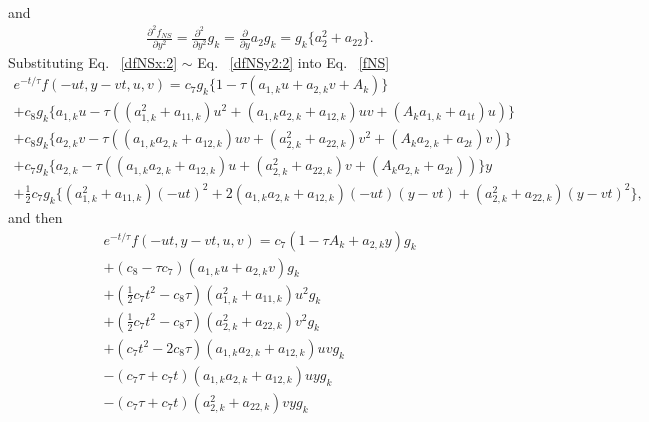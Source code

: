 \documentclass[review]{elsarticle}
\begin{document}
\begin{itemize}
\begin{eqnarray}
		\end{eqnarray}	
		and
		\begin{eqnarray}\label{dfNSy2:2}
			\frac{\partial^2 f_{NS}}{\partial y^2}=\frac{\partial^{2}}{\partial y^{2}} {g_{k}}
			=\frac{\partial}{\partial y} {a_2g_{k}}=g_k\{a_2^2+a_{22}\}.
		\end{eqnarray}
		Substituting Eq. ~\eqref{dfNSx:2} $\sim$ Eq. ~\eqref{dfNSy2:2} into Eq. ~\eqref{fNS}
		\begin{equation}\label{fNS:2}
		\begin{gathered}
			e^{-t/\tau}f(-ut, y-vt, u, v) = c_7g_k\{1-\tau\left(a_{1,k}u+a_{2,k}v+A_k\right)\}\\
			+c_8g_k\{
				a_{1,k}u-\tau\left(
				\left(a_{1,k}^2+a_{11,k}\right)u^2
				+\left(a_{1,k}a_{2,k}+a_{12,k}\right)uv
				+\left(A_ka_{1,k}+a_{1t}\right)u
				\right)
			    \}\\
			+c_8g_k\{
				a_{2,k}v-\tau\left(
				\left(a_{1,k}a_{2,k}+a_{12,k}\right)uv
				+\left(a_{2,k}^2+a_{22,k}\right)v^2
				+\left(A_ka_{2,k}+a_{2t}\right)v
				\right)
				\}\\
			+c_7g_k\{
				a_{2,k}-\tau\left(
				\left(a_{1,k}a_{2,k}+a_{12,k}\right)u
				+\left(a_{2,k}^2+a_{22,k}\right)v
				+\left(A_ka_{2,k}+a_{2t}\right)
				\right)
				\}y\\
			+\frac{1}{2}c_7g_k\{
				\left(a_{1,k}^2+a_{11,k}\right)\left(-ut\right)^2
				+2\left(a_{1,k}a_{2,k}+a_{12,k}\right)\left(-ut\right)\left(y-vt\right)
				+\left(a_{2,k}^2+a_{22,k}\right)\left(y-vt\right)^2
				\},
		\end{gathered}
		\end{equation}	
		and then
		\begin{equation}\label{fNS:3}
		\begin{gathered}
		e^{-t/\tau}f(-ut, y-vt, u, v) =c_7\left(1-\tau A_k + a_{2,k}y\right)g_k\\
			+\left(c_8-\tau c_7\right)\left(a_{1,k}u+a_{2,k}v\right)g_k\\
			+\left(\frac{1}{2}c_7t^2-c_8\tau\right)\left(a_{1,k}^2+a_{11,k}\right)u^2g_k\\
			+\left(\frac{1}{2}c_7t^2-c_8\tau\right)\left(a_{2,k}^2+a_{22,k}\right)v^2g_k\\
			+\left(c_7t^2-2c_8\tau\right)\left(a_{1,k}a_{2,k}+a_{12,k}\right)uvg_k\\
			-\left(c_7\tau+c_7t\right)\left(a_{1,k}a_{2,k}+a_{12,k}\right)uyg_k\\
			-\left(c_7\tau+c_7t\right)\left(a_{2,k}^2+a_{22,k}\right)vyg_k\\

\end{gathered}
\end{equation}
\end{itemize}
\end{document}

